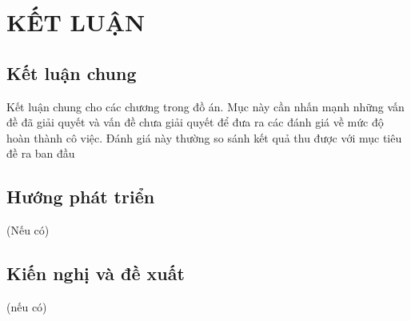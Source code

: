 
\section*{KẾT LUẬN}
\subsection*{Kết luận chung}
Kết luận chung cho các chương trong đồ án. Mục này cần nhấn mạnh những vấn đề đã giải
quyết và vấn đề chưa giải quyết để đưa ra các đánh giá về mức độ hoàn thành cô việc. Đánh 
giá này thường so sánh kết quả thu được với mục tiêu đề ra ban đầu 

\subsection*{Hướng phát triển}
(Nếu có) \cite{nhu2019effects}

\subsection*{Kiến nghị và đề xuất}
(nếu có)

\cleardoublepage